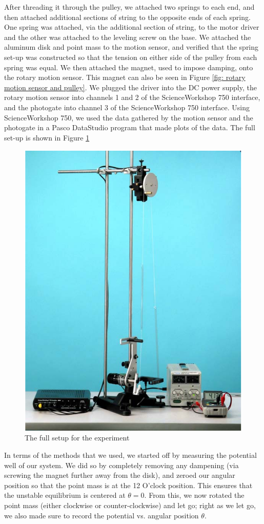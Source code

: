 \documentclass[twocolumn,amsmath,amssymb,pra, floatfix]{revtex4-2}
\begin{document}
After threading it through the pulley, we attached two springs to each end, and then attached additional sections of string to the opposite ends of each spring. One spring was attached, via the additional section of string, to the motor driver and the other was attached to the leveling screw on the base. We attached the aluminum disk and point mass to the motion sensor, and verified that the spring set-up was constructed so that the tension on either side of the pulley from each spring was equal. 
We then attached the magnet, used to impose damping, onto the rotary motion sensor. This magnet can also be seen in Figure \ref{fig: rotary motion sensor and pulley}. We plugged the driver into the DC power supply, the rotary motion sensor into channels 1 and 2 of the ScienceWorkshop 750 interface, and the photogate into channel 3 of the ScienceWorkshop 750 interface. Using ScienceWorkshop 750, we used the data gathered by the motion sensor and the photogate in a Pasco DataStudio program that made plots of the data. The full set-up is shown in Figure \ref{fig: Full Setup}

\begin{figure}[H]
    \centering
    \includegraphics[width = 0.5\linewidth]{images/Full_Setup.png}
    \caption{The full setup for the experiment}
    \label{fig: Full Setup}
\end{figure}

In terms of the methods that we used, we started off by measuring the potential well of our system.
We did so by completely removing any dampening (via screwing the magnet further away from the disk),
and zeroed our angular position so that the point mass is at the 12 O'clock position. This ensures that
the unstable equilibrium is centered at $\theta = 0$. From this, we now rotated the point mass (either clockwise or counter-clockwise) and let go; right as we let go, we also made sure to record the potential
vs. angular position $\theta$. 
\end{document}
